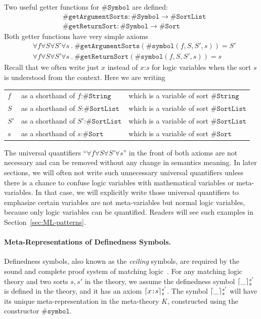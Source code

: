 \documentclass[UTF8,11pt]{article}
\theoremstyle{plain}
\theoremstyle{definition}
\theoremstyle{remark}
\DeclarePairedDelimiter{\ceil}{\lceil}{\rceil}
\newcommand{\cln}{\texttt{:}}
\newcommand{\sharpsymbol}{\#}
\newcommand{\KString}{\texttt{\sharpsymbol String}}
\newcommand{\KSort}{\texttt{\sharpsymbol Sort}}
\newcommand{\KSymbol}{\texttt{\sharpsymbol Symbol}}
\newcommand{\Ksymbol}{\texttt{\sharpsymbol symbol}}
\newcommand{\KgetArgumentSorts}{\texttt{\sharpsymbol getArgumentSorts}}
\newcommand{\KgetReturnSort}{\texttt{\sharpsymbol getReturnSort}}
\newcommand{\KSortList}{\texttt{\sharpsymbol SortList}}
\begin{document}
Two useful getter functions for $\KSymbol$ are defined:
\begin{align*}
 & \KgetArgumentSorts \colon \KSymbol \to \KSortList \\
 & \KgetReturnSort    \colon \KSymbol \to \KSort
\end{align*}
Both getter functions have very simple axioms
\begin{align*}
 & \forall f\forall S \forall S'\forall s \ .\ \KgetArgumentSorts(\Ksymbol(f, S, 
 S', s)) = S'\\
 & \forall f\forall S \forall S'\forall s \ .\ \KgetReturnSort(\Ksymbol(f, S, S', 
 s)) = s
\end{align*}
Recall that we often write just $x$ instead of $x \cln s$ for logic variables 
when the sort $s$ is understood from the context.
Here we are writing
\begin{center}
\begin{tabular}{lll}
	$f$ & as a shorthand of $f \cln \KString$ & which is a variable of sort 
	$\KString$ \\
	$S$ & as a shorthand of $S \cln \KSortList$ & which is a variable of sort 
	$\KSortList$ \\
	$S'$ & as a shorthand of $S' \cln \KSortList$ & which is a variable of sort 
	$\KSortList$ \\
	$s$ & as a shorthand of $s \cln \KSort$ & which is a variable of sort 
	$\KSort$
\end{tabular}
\end{center}
The universal quantifiers ``$\forall f\forall S \forall S'\forall s$'' in the 
front of both axioms are not necessary and can be removed without any change in 
semantics meaning.
In later sections, we will often not write such unnecessary universal 
quantifiers unless there is a chance to confuse logic variables with 
mathematical variables or meta-variables.
In that case, we will explicitly write those universal quantifiers to emphasize 
certain variables are not meta-variables but normal logic variables, because 
only logic variables can be quantified.
Readers will see such examples in Section~\ref{sec:ML-patterns}.

\paragraph{Meta-Representations of Definedness Symbols.}
Definedness symbols, also known as the \emph{ceiling} symbols, are required by 
the sound and complete proof system of matching logic~\cite{rosu-2017-lmcs}.
For any matching logic theory and two sorts $s, s'$ in the theory, we assume 
the definedness symbol $\ceil{\_}_s^{s'}$ is defined in the theory, and it has 
an axiom $\ceil{x \cln s}_s^{s'}$.
The symbol $\ceil{\_}_s^{s'}$ will have its unique meta-representation in the 
meta-theory $K$, constructed using the constructor $\Ksymbol$.
\end{document}
